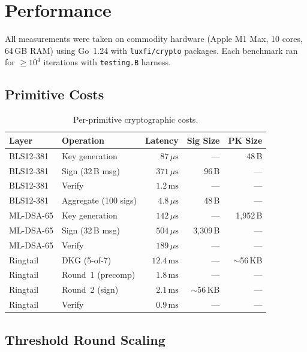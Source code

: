 \documentclass[11pt,a4paper]{article}
\begin{document}
\section{Performance}
\label{sec:performance}

All measurements were taken on commodity hardware (Apple M1 Max, 10 cores,
64\,GB RAM) using Go~1.24 with \texttt{luxfi/crypto} packages. Each
benchmark ran for $\geq 10^4$ iterations with \texttt{testing.B} harness.

\subsection{Primitive Costs}

\begin{table}[ht]
\centering
\begin{tabular}{@{}llrrr@{}}
\toprule
\textbf{Layer} & \textbf{Operation} & \textbf{Latency} & \textbf{Sig Size} & \textbf{PK Size} \\
\midrule
BLS12-381  & Key generation & $87\,\mu\text{s}$  & --- & 48\,B \\
BLS12-381  & Sign (32\,B msg) & $371\,\mu\text{s}$ & 96\,B & --- \\
BLS12-381  & Verify & $1.2\,\text{ms}$ & --- & --- \\
BLS12-381  & Aggregate (100 sigs) & $4.8\,\mu\text{s}$ & 48\,B & --- \\
\midrule
ML-DSA-65  & Key generation & $142\,\mu\text{s}$ & --- & 1{,}952\,B \\
ML-DSA-65  & Sign (32\,B msg) & $504\,\mu\text{s}$ & 3{,}309\,B & --- \\
ML-DSA-65  & Verify & $189\,\mu\text{s}$ & --- & --- \\
\midrule
Ringtail   & DKG (5-of-7)     & $12.4\,\text{ms}$ & --- & $\sim$56\,KB \\
Ringtail   & Round~1 (precomp) & $1.8\,\text{ms}$ & --- & --- \\
Ringtail   & Round~2 (sign)    & $2.1\,\text{ms}$ & $\sim$56\,KB & --- \\
Ringtail   & Verify             & $0.9\,\text{ms}$ & --- & --- \\
\bottomrule
\end{tabular}
\caption{Per-primitive cryptographic costs.}
\label{tab:primitives}
\end{table}

\subsection{Threshold Round Scaling}
\end{document}
